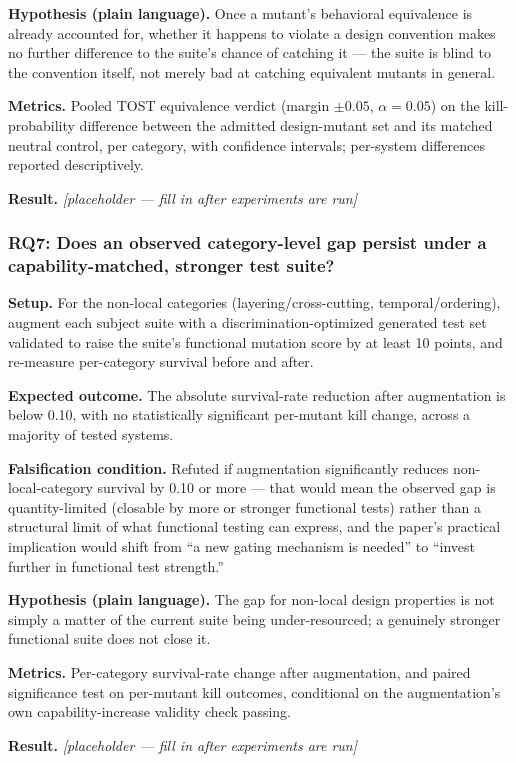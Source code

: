 \documentclass[11pt]{article}
\newcommand{\ph}{\textit{[placeholder --- fill in after experiments are run]}}
\begin{document}
\textbf{Hypothesis (plain language).} Once a mutant's behavioral equivalence is already accounted for, whether it happens to violate a design convention makes no further difference to the suite's chance of catching it --- the suite is blind to the convention itself, not merely bad at catching equivalent mutants in general.

\textbf{Metrics.} Pooled TOST equivalence verdict (margin $\pm 0.05$, $\alpha = 0.05$) on the kill-probability difference between the admitted design-mutant set and its matched neutral control, per category, with confidence intervals; per-system differences reported descriptively.

\textbf{Result.} \ph

\subsubsection{RQ7: Does an observed category-level gap persist under a capability-matched, stronger test suite?}
\textbf{Setup.} For the non-local categories (layering/cross-cutting, temporal/ordering), augment each subject suite with a discrimination-optimized generated test set validated to raise the suite's functional mutation score by at least 10 points, and re-measure per-category survival before and after.

\textbf{Expected outcome.} The absolute survival-rate reduction after augmentation is below 0.10, with no statistically significant per-mutant kill change, across a majority of tested systems.

\textbf{Falsification condition.} Refuted if augmentation significantly reduces non-local-category survival by 0.10 or more --- that would mean the observed gap is quantity-limited (closable by more or stronger functional tests) rather than a structural limit of what functional testing can express, and the paper's practical implication would shift from ``a new gating mechanism is needed'' to ``invest further in functional test strength.''

\textbf{Hypothesis (plain language).} The gap for non-local design properties is not simply a matter of the current suite being under-resourced; a genuinely stronger functional suite does not close it.

\textbf{Metrics.} Per-category survival-rate change after augmentation, and paired significance test on per-mutant kill outcomes, conditional on the augmentation's own capability-increase validity check passing.

\textbf{Result.} \ph
\end{document}
